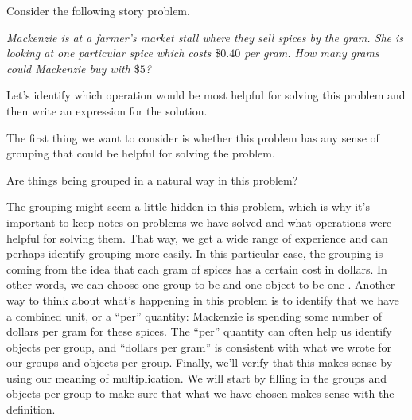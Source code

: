 \documentclass{ximera}
\begin{document}
\begin{example}
Consider the following story problem.

\emph{Mackenzie is at a farmer's market stall where they sell spices by the gram. She is looking at one particular spice which costs $\$0.40$ per gram. How many grams could Mackenzie buy with $\$5$?}

Let's identify which operation would be most helpful for solving this problem and then write an expression for the solution.

The first thing we want to consider is whether this problem has any sense of grouping that could be helpful for solving the problem.
\begin{question}
Are things being grouped in a natural way in this problem?
\begin{multipleChoice}
\end{multipleChoice} 
\end{question}
The grouping might seem a little hidden in this problem, which is why it's important to keep notes on problems we have solved and what operations were helpful for solving them. That way, we get a wide range of experience and can perhaps identify grouping more easily. In this particular case, the grouping is coming from the idea that each gram of spices has a certain cost in dollars. In other words, we can choose one group to be  and one object to be one . Another way to think about what's happening in this problem is to identify that we have a combined unit, or a ``per'' quantity: Mackenzie is spending some number of dollars per gram for these spices. The ``per'' quantity can often help us identify objects per group, and ``dollars per gram'' is consistent with what we wrote for our groups and objects per group. Finally, we'll verify that this makes sense by using our meaning of multiplication. We will start by filling in the groups and objects per group to make sure that what we have chosen makes sense with the definition.

\begin{image}
\end{image}


\end{example}
\end{document}
